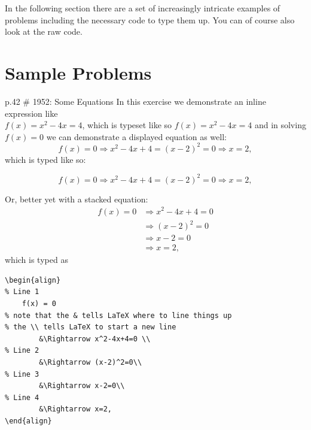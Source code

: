 \documentclass[12pt]{article}
\begin{document}
\noindent
In the following section there are a set of increasingly intricate examples of problems including the necessary code to type them up.  You can of course also look at the raw code.

\section{Sample Problems}


\begin{problem}{p.42 \# 1952: Some Equations}
    In this exercise we demonstrate an inline expression like\\ \(f(x)=x^2-4x=4\), which is typeset like so \texttt{\(f(x)=x^2-4x=4\)} and in solving $f(x)=0$ we can demonstrate a displayed equation as well:
        \[f(x)=0\Rightarrow x^2-4x+4=(x-2)^2=0 \Rightarrow x=2,\]
    which is typed like so:
    
\begin{center}
\texttt{\[f(x)=0\Rightarrow x^2-4x+4=(x-2)^2=0 \Rightarrow x=2,\]}
\end{center}
    
    Or, better yet with a stacked equation:
    \begin{align}
        f(x) = 0 
            &\Rightarrow x^2-4x+4=0 \\
            &\Rightarrow (x-2)^2=0\\
            &\Rightarrow x-2=0\\
            &\Rightarrow x=2,
    \end{align}
    which is typed as

\begin{verbatim}
\begin{align}
% Line 1
    f(x) = 0 
% note that the & tells LaTeX where to line things up
% the \\ tells LaTeX to start a new line
        &\Rightarrow x^2-4x+4=0 \\
% Line 2
        &\Rightarrow (x-2)^2=0\\
% Line 3
        &\Rightarrow x-2=0\\
% Line 4
        &\Rightarrow x=2,
\end{align}
\end{verbatim}

\end{problem}
\end{document}
